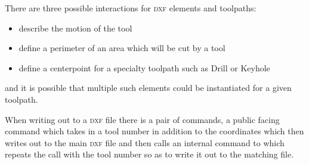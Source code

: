 \documentclass{ltxdoc}
\begin{document}
There are three possible interactions for \textsc{dxf} elements and toolpaths:

\begin{itemize}
 \item describe the motion of the tool
 \item define a perimeter of an area which will be cut by a tool
 \item define a centerpoint for a specialty toolpath such as Drill or Keyhole
\end{itemize}
 
\noindent and it is possible that multiple such elements could be instantiated for a given toolpath.
 
When writing out to a \textsc{dxf} file there is a pair of commands, a public facing command which takes in a tool number in addition to the coordinates which then writes out to the main \textsc{dxf} file and then calls an internal command to which repeats the call with the tool number so as to write it out to the matching file.

%
%
%
\end{document}
